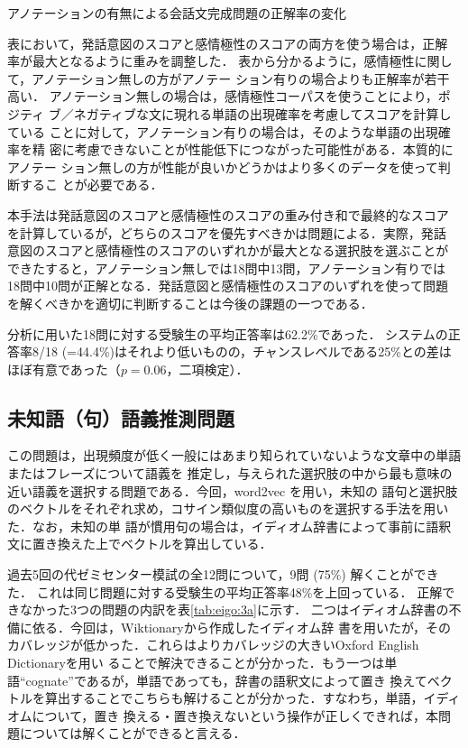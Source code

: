 \documentclass[japanese]{jnlp_1.4b}
\begin{document}
\begin{table}[b]
\caption{アノテーションの有無による会話文完成問題の正解率の変化}
\label{tab:eigo:2b}

\end{table}

表において，発話意図のスコアと感情極性のスコアの両方を使う場合は，正解
率が最大となるように重みを調整した．
表から分かるように，感情極性に関して，アノテーション無しの方がアノテー
ション有りの場合よりも正解率が若干高い．
アノテーション無しの場合は，感情極性コーパスを使うことにより，ポジティ
ブ／ネガティブな文に現れる単語の出現確率を考慮してスコアを計算している
ことに対して，アノテーション有りの場合は，そのような単語の出現確率を精
密に考慮できないことが性能低下につながった可能性がある．本質的にアノテー
ション無しの方が性能が良いかどうかはより多くのデータを使って判断するこ
とが必要である．

本手法は発話意図のスコアと感情極性のスコアの重み付き和で最終的なスコア
を計算しているが，どちらのスコアを優先すべきかは問題による．実際，発話
意図のスコアと感情極性のスコアのいずれかが最大となる選択肢を選ぶことが
できたすると，アノテーション無しでは18問中13問，アノテーション有りでは
18問中10問が正解となる．発話意図と感情極性のスコアのいずれを使って問題
を解くべきかを適切に判断することは今後の課題の一つである．

分析に用いた18問に対する受験生の平均正答率は62.2\%であった．
システムの正答率8/18 (=44.4\%)はそれより低いものの，チャンスレベルである25\%との差は
ほぼ有意であった（$p=0.06$，二項検定）．


\subsection{未知語（句）語義推測問題}
\label{sec:eigo:3a}

この問題は，出現頻度が低く一般にはあまり知られていないような文章中の単語またはフレーズについて語義を
推定し，与えられた選択肢の中から最も意味の近い語義を選択する問題である．今回，word2vec \cite{Mikolov13}を用い，未知の
語句と選択肢のベクトルをそれぞれ求め，コサイン類似度の高いものを選択する手法を用いた．なお，未知の単
語が慣用句の場合は，イディオム辞書によって事前に語釈文に置き換えた上でベクトルを算出している．

過去5回の代ゼミセンター模試の全12問について，9問 (75\%) 解くことができた．
これは同じ問題に対する受験生の平均正答率48\%を上回っている．
正解できなかった3つの問題の内訳を表\ref{tab:eigo:3a}に示す．
二つはイディオム辞書の不備に依る．今回は，Wiktionaryから作成したイディオム辞
書を用いたが，そのカバレッジが低かった．これらはよりカバレッジの大きいOxford English Dictionaryを用い
ることで解決できることが分かった．もう一つは単語``cognate''であるが，単語であっても，辞書の語釈文によって置き
換えてベクトルを算出することでこちらも解けることが分かった．すなわち，単語，イディオムについて，置き
換える・置き換えないという操作が正しくできれば，本問題については解くことができると言える．
\end{document}

